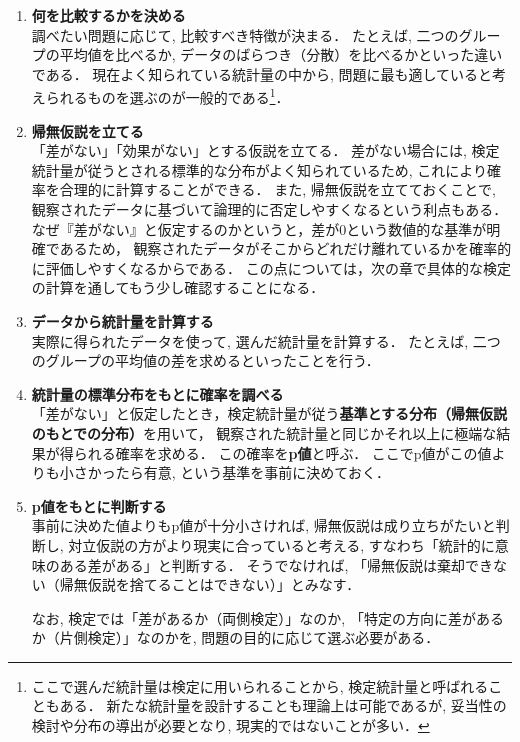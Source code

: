     \begin{enumerate}
      \item \textbf{何を比較するかを決める} \\
        調べたい問題に応じて, 比較すべき特徴が決まる．
        たとえば, 二つのグループの平均値を比べるか,
        データのばらつき（分散）を比べるかといった違いである．
        現在よく知られている統計量の中から,
        問題に最も適していると考えられるものを選ぶのが一般的である\footnote{
          ここで選んだ統計量は検定に用いられることから, 検定統計量と呼ばれることもある．
          新たな統計量を設計することも理論上は可能であるが,
          妥当性の検討や分布の導出が必要となり, 現実的ではないことが多い．}．
    
      \item \textbf{帰無仮説を立てる} \\
        「差がない」「効果がない」とする仮説を立てる．
        差がない場合には, 検定統計量が従うとされる標準的な分布がよく知られているため,
        これにより確率を合理的に計算することができる．
        また, 帰無仮説を立てておくことで,
        観察されたデータに基づいて論理的に否定しやすくなるという利点もある．
        なぜ『差がない』と仮定するのかというと，差が0という数値的な基準が明確であるため，
        観察されたデータがそこからどれだけ離れているかを確率的に評価しやすくなるからである．
        この点については，次の章で具体的な検定の計算を通してもう少し確認することになる．
    
      \item \textbf{データから統計量を計算する} \\
        実際に得られたデータを使って, 選んだ統計量を計算する．
        たとえば, 二つのグループの平均値の差を求めるといったことを行う．
    
      \item \textbf{統計量の標準分布をもとに確率を調べる} \\
        「差がない」と仮定したとき，検定統計量が従う\textbf{基準とする分布（帰無仮説のもとでの分布）}を用いて，
        観察された統計量と同じかそれ以上に極端な結果が得られる確率を求める．
        この確率を\textbf{p値}と呼ぶ．
        ここでp値がこの値よりも小さかったら有意, という基準を事前に決めておく．

      \item \textbf{p値をもとに判断する} \\
        事前に決めた値よりもp値が十分小さければ,
        帰無仮説は成り立ちがたいと判断し, 対立仮説の方がより現実に合っていると考える, 
        すなわち「統計的に意味のある差がある」と判断する．
        そうでなければ, 「帰無仮説は棄却できない（帰無仮説を捨てることはできない）」とみなす．

        なお, 検定では「差があるか（両側検定）」なのか,
        「特定の方向に差があるか（片側検定）」なのかを,
        問題の目的に応じて選ぶ必要がある．
    \end{enumerate}
    
